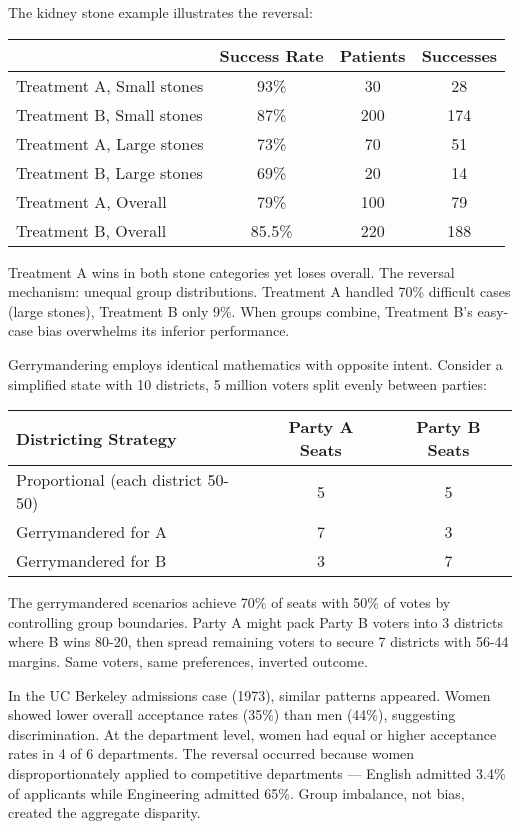 The kidney stone example illustrates the reversal:

\begin{center}
\begin{tabular}{lccc}
\toprule
 & Success Rate & Patients & Successes \\
\midrule
Treatment A, Small stones & 93\% & 30 & 28 \\
Treatment B, Small stones & 87\% & 200 & 174 \\
Treatment A, Large stones & 73\% & 70 & 51 \\
Treatment B, Large stones & 69\% & 20 & 14 \\
\midrule
Treatment A, Overall & 79\% & 100 & 79 \\
Treatment B, Overall & 85.5\% & 220 & 188 \\
\bottomrule
\end{tabular}
\end{center}

Treatment A wins in both stone categories yet loses overall. The reversal mechanism: unequal group distributions. Treatment A handled 70\% difficult cases (large stones), Treatment B only 9\%. When groups combine, Treatment B's easy-case bias overwhelms its inferior performance.

Gerrymandering employs identical mathematics with opposite intent. Consider a simplified state with 10 districts, 5 million voters split evenly between parties:

\begin{center}
\begin{tabular}{lcc}
\toprule
Districting Strategy & Party A Seats & Party B Seats \\
\midrule
Proportional (each district 50-50) & 5 & 5 \\
Gerrymandered for A & 7 & 3 \\
Gerrymandered for B & 3 & 7 \\
\bottomrule
\end{tabular}
\end{center}

The gerrymandered scenarios achieve 70\% of seats with 50\% of votes by controlling group boundaries. Party A might pack Party B voters into 3 districts where B wins 80-20, then spread remaining voters to secure 7 districts with 56-44 margins. Same voters, same preferences, inverted outcome.

In the UC Berkeley admissions case (1973), similar patterns appeared. Women showed lower overall acceptance rates (35\%) than men (44\%), suggesting discrimination. At the department level, women had equal or higher acceptance rates in 4 of 6 departments. The reversal occurred because women disproportionately applied to competitive departments — English admitted 3.4\% of applicants while Engineering admitted 65\%. Group imbalance, not bias, created the aggregate disparity.

